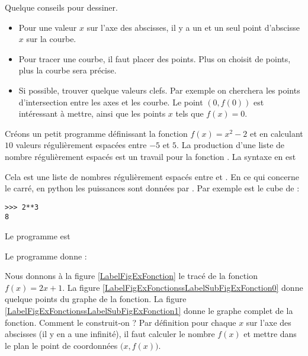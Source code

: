 Quelque conseils pour dessiner.
\begin{itemize}
    \item
        Pour une valeur $x$ sur l'axe des abscisses, il y a un et un seul point d'abscisse $x$ sur la courbe.
    \item
        Pour tracer une courbe, il faut placer des points. Plus on choisit de points, plus la courbe sera précise.
    \item
        Si possible, trouver quelque valeurs clefs. Par exemple on cherchera les points d'intersection entre les axes et les courbe. Le point \( (0,f(0)) \) est intéressant à mettre, ainsi que les points \( x\) tels que \( f(x)=0\).
\end{itemize}

\begin{example}
    Créons un petit programme définissant la fonction \( f(x)=x^2-2\) et en calculant \( 10\) valeurs régulièrement espacées entre \( -5\) et \( 5\). La production d'une liste de nombre régulièrement espacés est un travail pour la fonction . La syntaxe en est 
\begin{quote}
\end{quote}
Cela est une liste de  nombres régulièrement espacés entre  et . En ce qui concerne le carré, en python les puissances sont données par \info{**}. Par exemple  est le cube de  :
\begin{verbatim}
>>> 2**3
8
\end{verbatim}
Le programme est



Le programme donne :

%

    
\end{example}



\newcommand{\CaptionFigExFonction}{Comment tracer la fonction \( f\colon x\to 2x+1\) ?}


Nous donnons à la figure \ref{LabelFigExFonction} le tracé de la fonction \( f(x)=2x+1\). La figure \ref{LabelFigExFonctionssLabelSubFigExFonction0} donne quelque points du graphe de la fonction. La figure \ref{LabelFigExFonctionssLabelSubFigExFonction1} donne le graphe complet de la fonction. Comment le construit-on ? Par définition pour chaque \( x\) sur l'axe des abscisses (il y en a une infinité), il faut calculer le nombre \( f(x)\) et mettre dans le plan le point de coordonnées \( \big( x,f(x) \big)\).

